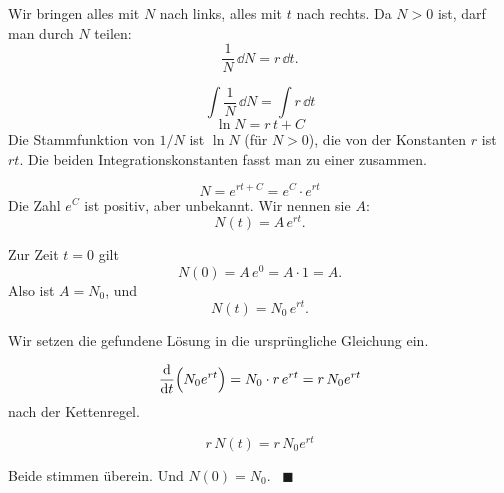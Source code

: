 \begin{merksatz}
Wir bringen alles mit $N$ nach links, alles mit $t$ nach rechts. Da $N > 0$ ist, darf man durch $N$ teilen:
\[ \frac{1}{N}\,\dd N = r\,\dd t . \]

\begin{center}
\begin{minipage}{0.88\textwidth}
\end{minipage}
\end{center}

\[ \int \frac{1}{N}\,\dd N = \int r\,\dd t \]
\[ \ln N = r\,t + C \]
Die Stammfunktion von $1/N$ ist $\ln N$ (für $N>0$), die von der Konstanten $r$ ist $rt$. Die beiden Integrationskonstanten fasst man zu einer zusammen.

\[ N = e^{rt + C} = e^{C}\cdot e^{rt} \]
Die Zahl $e^C$ ist positiv, aber unbekannt. Wir nennen sie $A$:
\[ N(t) = A\,e^{rt} . \]

Zur Zeit $t=0$ gilt
\[ N(0) = A\,e^{0} = A \cdot 1 = A . \]
Also ist $A = N_0$, und
\[ N(t) = N_0\,e^{rt} . \]

Wir setzen die gefundene Lösung in die ursprüngliche Gleichung ein.

\[ \frac{\mathrm{d}}{\mathrm{d} t}\Bigl(N_0e^{rt}\Bigr) = N_0 \cdot r\,e^{rt} = r\,N_0e^{rt} \]
nach der Kettenregel.

\[ r\,N(t) = r\,N_0e^{rt} \]

Beide stimmen überein. Und $N(0) = N_0$. \checkmark\ $\blacksquare$

\begin{center}
\begin{minipage}{0.88\textwidth}
\end{minipage}
\end{center}
\end{merksatz}

